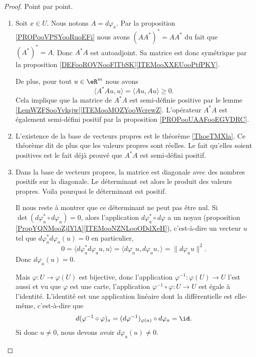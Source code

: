 \begin{proof}
    Point par point.
    \begin{enumerate}
        \item
            Soit \( x\in U\). Nous notons \( A=d\varphi_x\). Par la proposition \ref{PROPooVPSYooRuoEFi} nous avons \( (AA^*)^*=AA^*\) du fait que \( (A^*)^*=A\). Donc \( A^*A\) est autoadjoint. Sa matrice est donc symétrique par la proposition \ref{DEFooROVNooFlTbSK}\ref{ITEMooXXEUooPtfPKY}.
            
            De plus, pour tout \( u\in \eR^m\) nous avons
            \begin{equation}
                \langle A^*Au, u\rangle =\langle Au, Au\rangle \geq 0.
            \end{equation}
            Cela implique que la matrice de \( A^*A\) est semi-définie positive par le lemme \ref{LemWZFSooYvksjw}\ref{ITEMooMOZYooWcrewZ}. L'opérateur \( A^*A\) est également semi-défini positif par la proposition \ref{PROPooUAAFooEGVDRC}.
        \item
            L'existence de la base de vecteurs propres est le théorème \ref{ThoeTMXla}. Ce théorème dit de plus que les valeurs propres sont réelles. Le fait qu'elles soient positives est le fait déjà prouvé que \( A^*A\) est semi-défini positif.
        \item
            Dans la base de vecteurs propres, la matrice est diagonale avec des nombres positifs sur la diagonale. Le déterminant est alors le produit des valeurs propres. Voila pourquoi le déterminant est positif.

            Il nous reste à montrer que ce déterminant ne peut pas être nul. Si \( \det(d\varphi_a^*\circ d\varphi_a)=0\), alors l'application \( d\varphi_a^*\circ d\varphi\) a un noyau (proposition \ref{PropYQNMooZjlYlA}\ref{ITEMooNZNLooODdXeH}), c'est-à-dire un vecteur \( u\) tel que \( d\varphi_a^*d\varphi_a(u)=0\) en particulier,
            \begin{equation}
                0=\langle d\varphi_a^*d\varphi_au, u\rangle =\langle d\varphi_au,d\varphi_au, \rangle =\| d\varphi_au \|^2.
            \end{equation}
            Donc \( d\varphi_a(u)=0\).

            Mais \( \varphi\colon U\to \varphi(U)\) est bijective, donc l'application \( \varphi^{-1}\colon \varphi(U)\to U\) l'est aussi et vu que \( \varphi\) est une carte, l'application \( \varphi^{-1}\circ\varphi\colon U\to U\) est égale à l'identité. L'identité est une application linéaire dont la différentielle est elle-même, c'est-à-dire que
            \begin{equation}
                d(\varphi^{-1}\circ\varphi)_a=(d\varphi^{-1})_{\varphi(a)}\circ d\varphi_a=\id.
            \end{equation}
            Si donc \( u\neq 0\), nous devons avoir \( d\varphi_a(u)\neq 0\).
    \end{enumerate}
\end{proof}

